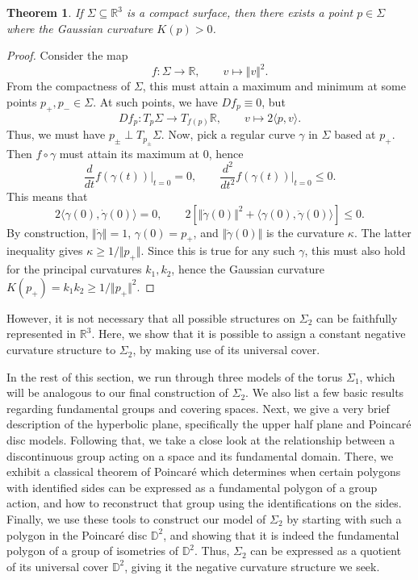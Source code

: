 \documentclass[12pt]{article}
\newcommand{\R}{\mathbb{R}}
\newtheorem{theorem}{Theorem}[section]
\theoremstyle{definition}
\theoremstyle{remark}
\begin{document}
    \begin{theorem}
        If $\Sigma \subseteq \R^3$ is a compact surface, then there exists a point $p
        \in \Sigma$ where the Gaussian curvature $K(p) > 0$.
    \end{theorem}
    \begin{proof}
        Consider the map \[
            f\colon \Sigma \to \R, \qquad v \mapsto \Vert v\Vert^2.
        \] From the compactness of $\Sigma$, this must attain a maximum and minimum
        at some points $p_+, p_- \in \Sigma$. At such points, we have $Df_p\equiv 0$,
        but \[
            Df_p\colon T_p\Sigma \to T_{f(p)}\R, \qquad v \mapsto 2\langle p,
            v\rangle.
        \] Thus, we must have $p_{\pm} \perp T_{p_\pm}\Sigma$. Now, pick a regular
        curve $\gamma$ in $\Sigma$ based at $p_+$. Then $f\circ \gamma$ must attain
        its maximum at $0$, hence \[
            \frac{d}{dt}f(\gamma(t))\Big|_{t = 0} = 0, \qquad
            \frac{d^2}{dt^2}f(\gamma(t))\Big|_{t = 0} \leq 0.
        \] This means that \[
            2\langle \gamma(0), \dot{\gamma}(0)\rangle = 0, \qquad
            2[\Vert \dot{\gamma}(0) \Vert^2 + \langle \gamma(0),
            \ddot{\gamma}(0)\rangle] \leq 0.
        \] By construction, $\Vert \dot{\gamma}\Vert = 1$, $\gamma(0) = p_+$, and
        $\Vert \ddot{\gamma}(0)\Vert$ is the curvature $\kappa$. The latter
        inequality gives $\kappa \geq 1 / \Vert p_+ \Vert$. Since this is true for
        any such $\gamma$, this must also hold for the principal curvatures $k_1,
        k_2$, hence the Gaussian curvature $K(p_+) = k_1k_2 \geq 1 / \Vert
        p_+\Vert^2$.
    \end{proof}


    However, it is not necessary that all possible structures on $\Sigma_2$ can be
    faithfully represented in $\R^3$. Here, we show that it is possible to assign a
    constant negative curvature structure to $\Sigma_2$, by making use of
    its universal cover.

    In the rest of this section, we run through three models of the torus $\Sigma_1$,
    which will be analogous to our final construction of $\Sigma_2$. We also list a
    few basic results regarding fundamental groups and covering spaces. Next, we give
    a very brief description of the hyperbolic plane, specifically the upper half
    plane and Poincar\'e disc models. Following that, we take a close look at the
    relationship between a discontinuous group acting on a space and its fundamental
    domain. There, we exhibit a classical theorem of Poincar\'e which determines when
    certain polygons with identified sides can be expressed as a fundamental polygon
    of a group action, and how to reconstruct that group using the identifications on
    the sides. Finally, we use these tools to construct our model of $\Sigma_2$ by
    starting with such a polygon in the Poincar\'e disc $\mathbb{D}^2$, and showing
    that it is indeed the fundamental polygon of a group of isometries of
    $\mathbb{D}^2$. Thus, $\Sigma_2$ can be expressed as a quotient of its universal
    cover $\mathbb{D}^2$, giving it the negative curvature structure we seek.
\end{document}

